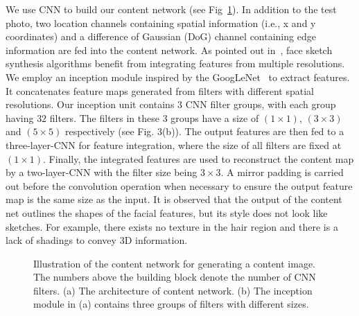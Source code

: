 \documentclass[10pt,twocolumn,letterpaper]{article}
\begin{document}
We use CNN to build our content network (see Fig~\ref{fig:content_NN}). In addition to the test photo, two location channels containing spatial information (i.e., x and y coordinates) and a difference of Gaussian (DoG) channel containing edge information are fed into the content network. As pointed out in~\cite{wang2009face}, face sketch synthesis algorithms benefit from integrating features from multiple resolutions. We employ an inception module inspired by the GoogLeNet~\cite{szegedy2015going} to extract features. It concatenates feature maps generated from filters with different spatial resolutions. Our inception unit contains $3$ CNN filter groups, with each group having $32$ filters. The filters in these 3 groups have a size of $\left(1\times1\right)$, $\left(3\times3\right)$ and $\left(5\times5\right)$ respectively (see Fig. 3(b)). The output features are then fed to a three-layer-CNN for feature integration, where the size of all filters are fixed at $\left(1\times1\right)$. Finally, the integrated features are used to reconstruct the content map by a two-layer-CNN with the filter size being $3\times3$. A mirror padding is carried out before the convolution operation when necessary to ensure the output feature map is the same size as the input. It is observed that the output of the content net outlines the shapes of the facial features, but its style does not look like sketches. For example, there exists no texture in the hair region and there is a lack of shadings to convey 3D information.
\begin{figure}[htbp]
\centering
{}
\caption{Illustration of the content network for generating a content image. The numbers above the building block denote the number of CNN filters. (a) The architecture of content network. (b) The inception module in (a) contains three groups of filters with different sizes.}
\label{fig:content_NN}
\end{figure}
\end{document}

